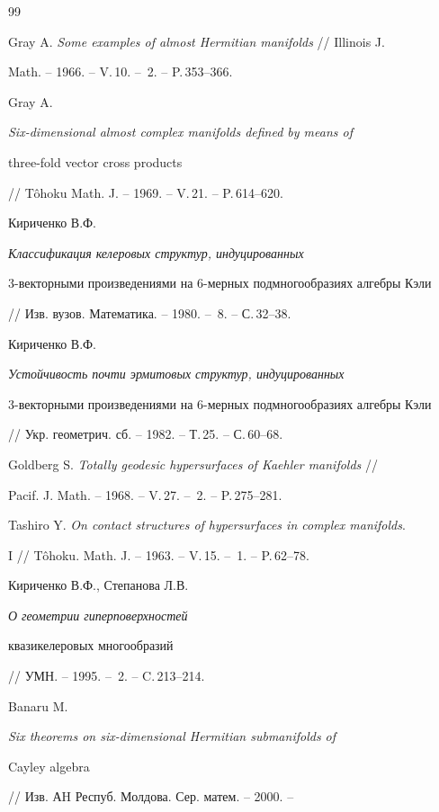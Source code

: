 \begin{thebibliography}{99}







Gray A. {\em Some examples of almost Hermitian manifolds} // Illinois J. 


Math. -- 1966. -- V.\,10. -- \No\,2. -- P.\,353--366.




Gray A. {\em Six-dimensional almost complex manifolds defined by means of


three-fold vector cross products}


// T\^ohoku Math. J. -- 1969. -- V.\,21. -- P.\,614--620.




Кириченко В.Ф. {\em Классификация келеровых структур, индуцированных 


$3$-векторными произведениями на 6-мерных подмногообразиях алгебры Кэли} 


// Изв. вузов. Математика. -- 1980. -- \No\,8. -- С.\,32--38.




Кириченко  В.Ф. {\em Устойчивость почти эрмитовых структур, индуцированных 


$3$-век\-тор\-ными произведениями на $6$-мерных подмногообразиях алгебры Кэли}


// Укр. геометрич. сб. -- 1982. -- Т.\,25. -- С.\,60--68.




Goldberg S. {\em Totally geodesic hypersurfaces of Kaehler manifolds} //


Pacif. J. Math. -- 1968. -- V.\,27. -- \No\,2. -- P.\,275--281.




Tashiro Y. {\em On contact structures of hypersurfaces in complex manifolds}.


I // T\^ohoku. Math. J. -- 1963. -- V.\,15. -- \No\,1. -- P.\,62--78.




Кириченко В.Ф., Степанова Л.В. {\em О геометрии гиперповерхностей 


квазикелеровых многообразий} // УМН. -- 1995. -- \No\,2. -- C.\,213--214.




Banaru M. {\em Six theorems on six-dimensional Hermitian submanifolds of 


Cayley algebra} // Изв. АH Респуб. Молдова. Сер. матем. -- 2000. --



\end{thebibliography}

